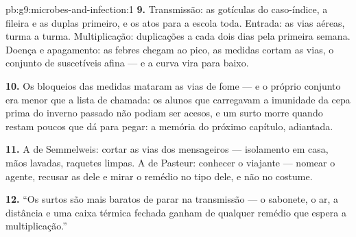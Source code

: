 \begin{solution}{pb:g9:microbes-and-infection:1}
\textbf{9.} Transmissão: as gotículas do caso-índice, a
fileira e as duplas primeiro, e os atos para a escola toda.
Entrada: as vias aéreas, turma a turma. Multiplicação:
duplicações a cada dois dias pela primeira semana. Doença e
apagamento: as febres chegam ao pico, as medidas cortam as
vias, o conjunto de suscetíveis afina --- e a curva vira para
baixo.

\textbf{10.} Os bloqueios das medidas mataram as vias de fome
--- e o próprio conjunto era menor que a lista de chamada: os
alunos que carregavam a imunidade da cepa prima do inverno
passado não podiam ser acesos, e um surto morre quando restam
poucos que dá para pegar: a memória do próximo capítulo,
adiantada.

\textbf{11.} A de Semmelweis: cortar as vias dos mensageiros
--- isolamento em casa, mãos lavadas, raquetes limpas. A de
Pasteur: conhecer o viajante --- nomear o agente, recusar as
 dele e mirar o remédio no tipo dele, e não no
costume.

\textbf{12.} ``Os surtos são mais baratos de parar na
transmissão --- o sabonete, o ar, a distância e uma caixa
térmica fechada ganham de qualquer remédio que espera a
multiplicação.''
\end{solution}
